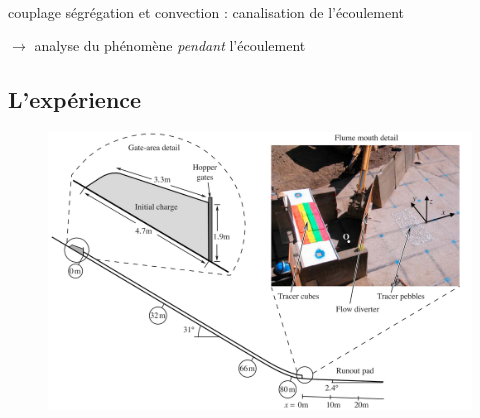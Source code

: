 \documentclass[xcolor=dvipsnames]{beamer}
\begin{document}
\begin{frame}
\begin{columns}
\begin{column}{6cm}
\begin{figure}
  \label{fig:small_scale}
\end{figure}

\end{column}

\end{columns}

~ \\
~ \\
~ \\
\begin{centering}
couplage ségrégation et convection : canalisation de l'écoulement 
\end{centering}

\begin{centering}
$\rightarrow$ analyse du phénomène \textit{pendant} l'écoulement
\end{centering}
\end{frame}

\subsection{L'expérience}
\begin{frame}

\begin{figure}[htp]
\centering
\includegraphics[scale=0.2]{img/whole_flume.png}
\label{}
\end{figure}

\end{frame}
\end{document}

